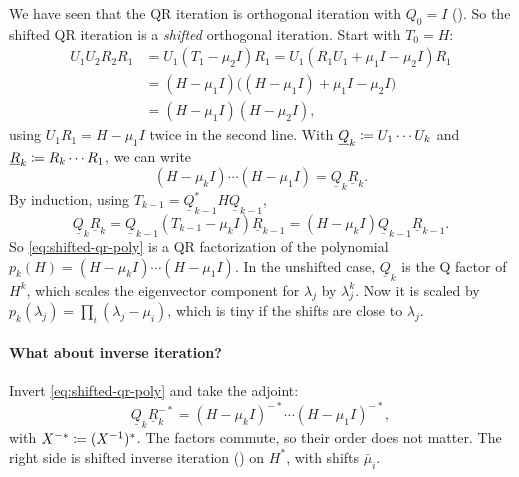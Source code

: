 We have seen that the QR iteration is orthogonal iteration with $Q_0 = I$ (). So the shifted QR iteration is a \emph{shifted} orthogonal iteration. Start with $T_0 = H$:
\begin{equation}
  \begin{aligned}
    U_1U_2R_2R_1 &= U_1(T_1 - \mu_2I)R_1 = U_1(R_1U_1 + \mu_1I - \mu_2I)R_1 \\
    &= (H - \mu_1I)\bigl((H - \mu_1I) + \mu_1I - \mu_2I\bigr) \\
    &= (H - \mu_1I)(H - \mu_2I),
  \end{aligned}
\end{equation}
using $U_1R_1 = H - \mu_1I$ twice in the second line. With $\underline{Q}_k \coloneqq U_1\cdots U_k$ and $\underline{R}_k \coloneqq R_k\cdots R_1$, we can write
\begin{equation}
  \label{eq:shifted-qr-poly}
  (H - \mu_kI)\cdots(H - \mu_1I) = \underline{Q}_k\underline{R}_k.
\end{equation}
By induction, using $T_{k-1} = \underline{Q}_{k-1}^\ast H\underline{Q}_{k-1}$,
\begin{equation}
  \underline{Q}_k\underline{R}_k = \underline{Q}_{k-1}(T_{k-1} - \mu_kI)\underline{R}_{k-1} = (H - \mu_kI)\underline{Q}_{k-1}\underline{R}_{k-1}.
\end{equation}
So \eqref{eq:shifted-qr-poly} is a QR factorization of the polynomial $p_k(H) = (H - \mu_kI)\cdots(H - \mu_1I)$. In the unshifted case, $\underline{Q}_k$ is the Q factor of $H^k$, which scales the eigenvector component for $\lambda_j$ by $\lambda_j^k$. Now it is scaled by $p_k(\lambda_j) = \prod_i(\lambda_j - \mu_i)$, which is tiny if the shifts are close to $\lambda_j$.

\paragraph{What about inverse iteration?} Invert \eqref{eq:shifted-qr-poly} and take the adjoint:
\begin{equation}
  \label{eq:shifted-qr-inverse}
  \underline{Q}_k\underline{R}_k^{-\ast} = (H - \mu_kI)^{-\ast}\cdots(H - \mu_1I)^{-\ast},
\end{equation}
with $X^{-\ast} \coloneqq (X^{-1})^\ast$. The factors commute, so their order does not matter. The right side is shifted inverse iteration () on $H^\ast$, with shifts $\bar{\mu}_i$.

